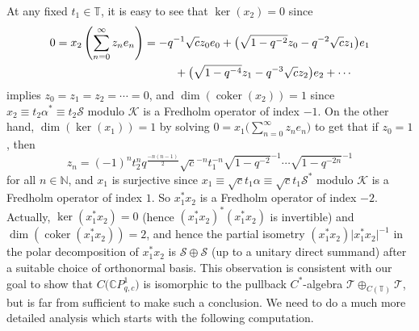 \documentclass[pdftex]{sigma}
\begin{document}
At any fixed $t_{1}\in\mathbb{T}$, it is easy to see that $\ker (x_{2}) =0$ since
\begin{gather*}
0=x_{2}\left( \sum_{n=0}^{\infty}z_{n}e_{n}\right) =-q^{-1}\sqrt{c}
z_{0}e_{0}+\big( \sqrt{1-q^{-2}}z_{0}-q^{-2}\sqrt{c}z_{1}\big)
e_{1}\\
\hphantom{0=x_{2}\left( \sum_{n=0}^{\infty}z_{n}e_{n}\right) =}{} +\big( \sqrt{1-q^{-4}}z_{1}-q^{-3}\sqrt{c}z_{2}\big) e_{2}+\cdots
\end{gather*}
implies $z_{0}=z_{1}=z_{2}=\cdots=0$, and $\dim( \operatorname{coker}(
x_{2}) ) =1$ since $x_{2}\equiv t_{2}\alpha^{\ast}\equiv
t_{2}\mathcal{S}$ modulo $\mathcal{K}$ is a Fredholm operator of index $-1$.
On the other hand, $\dim( \ker( x_{1}) ) =1$ by
solving $0=x_{1}\Big( \sum\limits_{n=0}^{\infty}z_{n}e_{n}\Big) $ to get that if
$z_{0}=1$, then
\[
z_{n}=( -1) ^{n}t_{2}^{n}q^{\frac{-n ( n-1 ) }{2}%
}\sqrt{c}^{-n}t_{1}^{-n}\sqrt{1-q^{-2}}^{-1}\cdots\sqrt{1-q^{-2n}}^{-1}%
\]
for all $n\in\mathbb{N}$, and $x_{1}$ is surjective since $x_{1}\equiv\sqrt
{c}t_{1}\alpha\equiv\sqrt{c}t_{1}\mathcal{S}^{\ast}$ modulo $\mathcal{K}$ is a
Fredholm operator of index $1$. So $x_{1}^{\ast}x_{2}$ is a Fredholm operator
of index $-2$. Actually, $\ker ( x_{1}^{\ast}x_{2} ) =0$ (hence
$ ( x_{1}^{\ast}x_{2} ) ^{\ast} ( x_{1}^{\ast}x_{2}) $
is invertible) and $\dim ( \operatorname{coker} ( x_{1}^{\ast}%
x_{2} ) ) =2$, and hence the partial isometry $(
x_{1}^{\ast}x_{2}) \vert x_{1}^{\ast}x_{2}\vert ^{-1}$ in
the polar decomposition of $x_{1}^{\ast}x_{2}$ is $\mathcal{S}\oplus
\mathcal{S}$ (up to a unitary direct summand) after a suitable choice of
orthonormal basis. This observation is consistent with our goal to show that
$C\big( \mathbb{C}P_{q,c}^{1}\big) $ is isomorphic to the pullback
$C^*$-algebra $\mathcal{T}\oplus_{C ( \mathbb{T} ) }\mathcal{T}$, but
is far from sufficient to make such a conclusion. We need to do a much more
detailed analysis which starts with the following computation.
\end{document}
